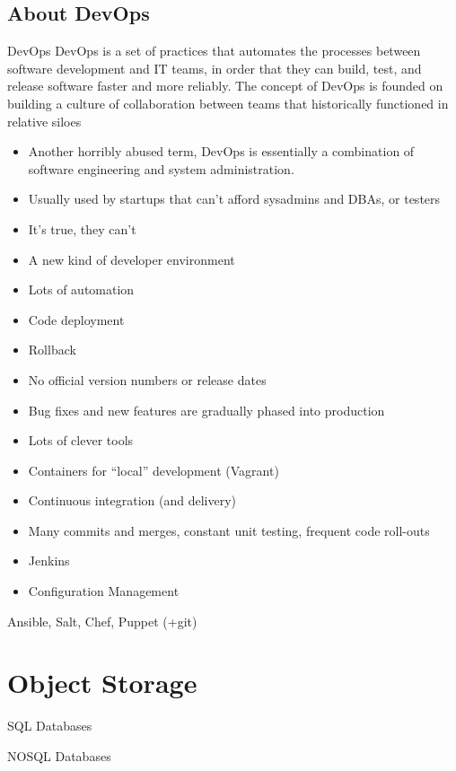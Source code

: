 \documentclass[fancy,11pt,titlestyle=display]{style/elegantbook}
\begin{document}
\section{About DevOps}

\begin{definition}{DevOps}{}
DevOps is a set of practices that automates the processes between software development and IT teams, in order that they can build, test, and release software faster and more reliably. The concept of DevOps is founded on building a culture of collaboration between teams that historically functioned in relative siloes
\end{definition}

\begin{itemize}
\item Another horribly abused term, DevOps is essentially a combination of software engineering and system administration.
\item Usually used by startups that can't afford sysadmins and DBAs, or testers
\item It's true, they can't
\item A new kind of developer environment
\item Lots of automation
\item Code deployment
\item Rollback
\item No official version numbers or release dates
\item Bug fixes and new features are gradually phased into production
\item Lots of clever tools
\item Containers for ``local'' development (Vagrant)
\item Continuous integration (and delivery)
\item Many commits and merges, constant unit testing, frequent code roll-outs
\item Jenkins
\item Configuration Management
\end{itemize}


\begin{note}
Ansible, Salt, Chef, Puppet (+git)
\end{note}

\chapter{Object Storage}

\begin{introduction}[Topics]
\item SQL Databases
\item NOSQL Databases
\end{introduction}
\end{document}
